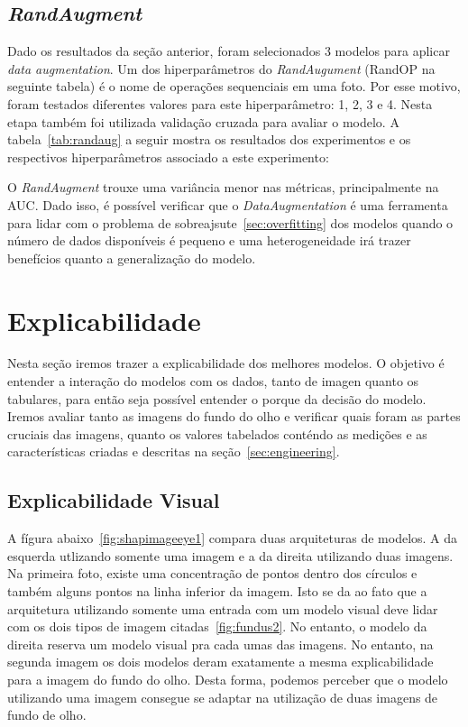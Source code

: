 \documentclass[ %
	msc, %
	portugues %
]{../ppgccufmg}
\begin{document}
    \subsection{\textit{RandAugment}}

    Dado os resultados da seção anterior, foram selecionados 3 modelos para aplicar \textit{data
    augmentation}. Um dos hiperparâmetros do \textit{RandAugument} (RandOP na seguinte tabela)
    é o nome de operações sequenciais em uma foto. Por esse motivo, foram testados diferentes valores para este hiperparâmetro: 1, 2,
    3 e 4. Nesta etapa também foi utilizada validação cruzada para avaliar o modelo. A
    tabela~\ref{tab:randaug} a seguir mostra os resultados dos experimentos e os respectivos
    hiperparâmetros associado a este experimento:

    

    O \textit{RandAugment} trouxe uma variância menor nas métricas, principalmente na AUC. Dado isso,
    é possível verificar que o \textit{DataAugmentation} é uma ferramenta para lidar
    com o problema de sobreajsute~\ref{sec:overfitting} dos modelos quando o número de dados
    disponíveis é pequeno e uma heterogeneidade irá trazer benefícios quanto a generalização do
    modelo.

    \section{Explicabilidade}\label{sec:resultexp}

    Nesta seção iremos trazer a explicabilidade dos melhores modelos. O objetivo é entender a
    interação do modelos com os dados, tanto de imagen quanto os tabulares, para então seja possível
    entender o porque da decisão do modelo. Iremos avaliar tanto as imagens do fundo do olho e
    verificar quais foram as partes cruciais das imagens, quanto os valores tabelados conténdo as
    medições e as características criadas e descritas na seção~\ref{sec:engineering}.

    \subsection{Explicabilidade Visual}



    A fígura abaixo~\ref{fig:shapimageeye1} compara duas arquiteturas de modelos. A da esquerda
    utlizando somente uma imagem e a da direita utilizando duas imagens. Na primeira foto, existe
    uma concentração de pontos dentro dos círculos e também alguns pontos na linha inferior da
    imagem. Isto se da ao fato que a arquitetura utilizando somente uma entrada com um modelo visual
    deve lidar com os dois tipos de imagem citadas~\ref{fig:fundus2}. No entanto, o modelo da
    direita reserva um modelo visual pra cada umas das imagens. No entanto, na segunda imagem os
    dois modelos deram exatamente a mesma explicabilidade para a imagem do fundo do olho. Desta
    forma, podemos perceber que o modelo utilizando uma imagem consegue se adaptar na utilização de
    duas imagens de fundo de olho.
\end{document}
